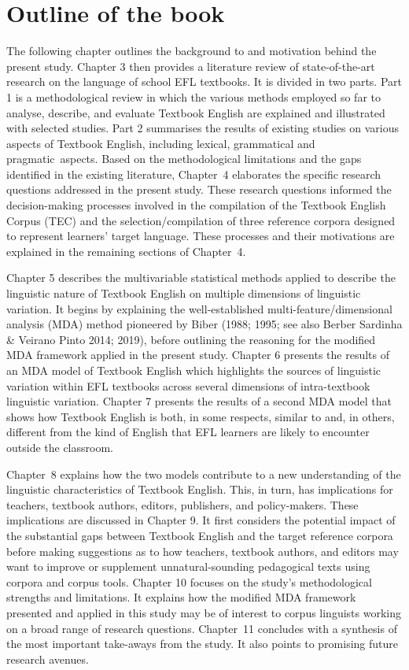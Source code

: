 \documentclass[
  letterpaper,
  DIV=11,
  numbers=noendperiod]{scrreprt}
\begin{document}
\section{Outline of the book}\label{outline-of-the-book}

The following chapter outlines the background to and motivation behind
the present study. Chapter 3 then provides a literature review of
state-of-the-art research on the language of school EFL textbooks. It is
divided in two parts. Part 1 is a methodological review in which the
various methods employed so far to analyse, describe, and evaluate
Textbook English are explained and illustrated with selected studies.
Part 2 summarises the results of existing studies on various aspects of
Textbook English, including lexical, grammatical and pragmatic~aspects.
Based on the methodological limitations and the gaps identified in the
existing literature, Chapter~4 elaborates the specific research
questions addressed in the present study. These research questions
informed the decision-making processes involved in the compilation of
the Textbook English Corpus (TEC) and the selection/compilation of three
reference corpora designed to represent learners' target language. These
processes and their motivations are explained in the remaining sections
of Chapter~4.

Chapter 5 describes the multivariable statistical methods applied to
describe the linguistic nature of Textbook English on multiple
dimensions of linguistic variation. It begins by explaining the
well-established multi-feature/dimensional analysis (MDA) method
pioneered by Biber (1988; 1995; see also Berber Sardinha \& Veirano
Pinto 2014; 2019), before outlining the reasoning for the modified MDA
framework applied in the present study. Chapter 6 presents the results
of an MDA model of Textbook English which highlights the sources of
linguistic variation within EFL textbooks across several dimensions of
intra-textbook linguistic variation. Chapter 7 presents the results of a
second MDA model that shows how Textbook English is both, in some
respects, similar to and, in others, different from the kind of English
that EFL learners are likely to encounter outside the classroom.

Chapter~8 explains how the two models contribute to a new understanding
of the linguistic characteristics of Textbook English. This, in turn,
has implications for teachers, textbook authors, editors, publishers,
and policy-makers. These implications are discussed in Chapter 9. It
first considers the potential impact of the substantial gaps between
Textbook English and the target reference corpora before making
suggestions as to how teachers, textbook authors, and editors may want
to improve or supplement unnatural‑sounding pedagogical texts using
corpora and corpus tools. Chapter 10 focuses on the study's
methodological strengths and limitations. It explains how the modified
MDA framework presented and applied in this study may be of interest to
corpus linguists working on a broad range of research questions.
Chapter~11 concludes with a synthesis of the most important take-aways
from the study. It also points to promising future research avenues.
\end{document}
